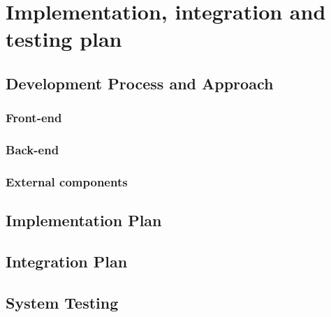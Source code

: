 \chapter{Implementation, integration and testing plan}
\section{Development Process and Approach}
\subsection{Front-end}
\subsection{Back-end}
\subsection{External components}

\section{Implementation Plan}

\section{Integration Plan}

\section{System Testing}